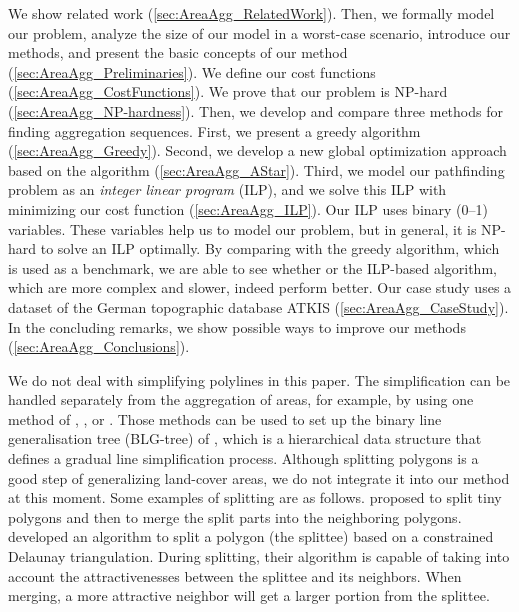 \documentclass[acmsmall,natbib=false]{acmart}
\begin{document}
We show related work (\sect\ref{sec:AreaAgg_RelatedWork}).
Then, we formally model our problem, 
analyze the size of our model in a worst-case scenario,
introduce our methods,
and present the basic concepts of our method
(\sect\ref{sec:AreaAgg_Preliminaries}).
We define our cost functions 
(\sect\ref{sec:AreaAgg_CostFunctions}).
We prove that our problem is NP-hard
(\sect\ref{sec:AreaAgg_NP-hardness}).
Then, we develop and compare three methods 
for finding aggregation sequences.
First, we present 
a greedy algorithm (\sect\ref{sec:AreaAgg_Greedy}).
Second, we develop a new global optimization approach
based on the \Astar algorithm 
(\sect\ref{sec:AreaAgg_AStar}).
Third, we model our pathfinding problem as
an \emph{integer linear program} (ILP), 
and we solve this ILP with minimizing our cost function
(\sect\ref{sec:AreaAgg_ILP}).
Our ILP uses binary (0--1) variables. 
These variables help us to model our problem, 
but in general, it is NP-hard 
to solve an ILP optimally.
By comparing with the greedy algorithm, 
which is used as a benchmark,
we are able to see whether \Astar or the ILP-based algorithm, 
which are more complex and slower, indeed perform better.  
Our case study 
uses a dataset of the German topographic database ATKIS 
(\sect\ref{sec:AreaAgg_CaseStudy}).
In the concluding remarks, we show possible ways to improve our 
methods (\sect\ref{sec:AreaAgg_Conclusions}). 

We do not deal with simplifying polylines in this paper.
The simplification can be handled separately from the
aggregation of areas, for example, 
by using one method of 
\textcite{Douglas1973},
\textcite{Saalfeld1999},
or \textcite{Wu2004DP}.
Those methods can be used to set up 
the binary line generalisation tree (BLG-tree) of
\textcite{vanOosterom1995Development},
which is a hierarchical data structure that 
defines a gradual line simplification process.
%
Although splitting polygons is a good step
of generalizing land-cover areas,
we do not integrate it into our method at this moment.
Some examples of splitting are as follows.
\textcite{Smith2007MasterMap,Thiemann2018LandCover} 
proposed to split tiny polygons 
and then to merge the split parts into the neighboring polygons.
\textcite{Meijers2016Split} developed an algorithm 
to split a polygon (the splittee) 
based on a constrained Delaunay triangulation.
During splitting, their algorithm is capable of
taking into account
the attractivenesses between the splittee and its neighbors.
When merging, a more attractive neighbor 
will get a larger portion from the splittee.
\end{document}
